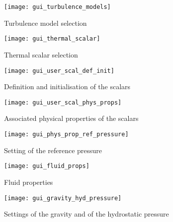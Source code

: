{{\begin{figure}[!ht]
\begin{center}
\texttt{[image: gui\_turbulence\_models]}
\caption{Turbulence model selection}
\label{fig:7_GUI}
\end{center}
\end{figure}

\begin{figure}[!ht]
\begin{center}
\texttt{[image: gui\_thermal\_scalar]}
\caption{Thermal scalar selection}
\label{fig:8_GUI}
\end{center}
\end{figure}

\begin{figure}[!ht]
\begin{center}
\texttt{[image: gui\_user\_scal\_def\_init]}
\caption{Definition and initialisation of the scalars}
\label{fig:11_GUI}
\end{center}
\end{figure}

\begin{figure}[!ht]
\begin{center}
\texttt{[image: gui\_user\_scal\_phys\_props]}
\caption{Associated physical properties of the scalars}
\label{fig:12_GUI}
\end{center}
\end{figure}

\begin{figure}[!ht]
\begin{center}
\texttt{[image: gui\_phys\_prop\_ref\_pressure]}
\caption{Setting of the reference pressure}
\label{fig:13_GUI}
\end{center}
\end{figure}

\begin{figure}[!ht]
\begin{center}
\texttt{[image: gui\_fluid\_props]}
\caption{Fluid properties}
\label{fig:14_GUI}
\end{center}
\end{figure}

\begin{figure}[!ht]
\begin{center}
\texttt{[image: gui\_gravity\_hyd\_pressure]}
\caption{Settings of the gravity and of the hydrostatic pressure}
\label{fig:15_GUI}
\end{center}
\end{figure}

}}
